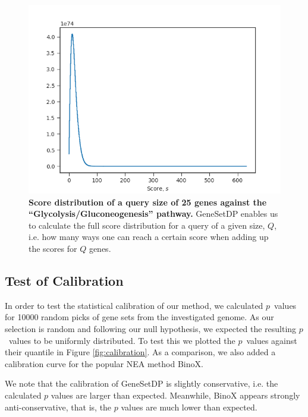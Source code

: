 \documentclass[a4paper,american]{lipics-v2016}
\begin{document}
\begin{figure}[htb]
		\begin{center}
				\includegraphics[scale=0.8]{figures/F1_score_distribuition.png}
		\end{center}
  \caption{{\bf Score distribution of a query size of 25 genes against the ``Glycolysis/Gluconeogenesis'' pathway.} GeneSetDP enables us to calculate the full score distribution for a query of a given size, $Q$, i.e. how many ways one can reach a certain score when adding up the scores for $Q$ genes.}
  \label{fig:score_dist}
\end{figure}

\subsection*{Test of Calibration}

In order to test the statistical calibration of our method, we calculated $p$~values for 10000 random picks of gene sets from the investigated genome. As our selection is random and following our null hypothesis, we expected the resulting $p$~values to be uniformly distributed. To test this we plotted the $p$~values against their quantile in Figure \ref{fig:calibration}. As a comparison, we also added a calibration curve for the popular NEA method BinoX\cite{ogris2016novel}.

We note that the calibration of GeneSetDP is slightly conservative, i.e. the calculated $p$ values are larger than expected. Meanwhile, BinoX appears strongly anti-conservative, that is, the $p$ values are much lower than expected.
\end{document}

